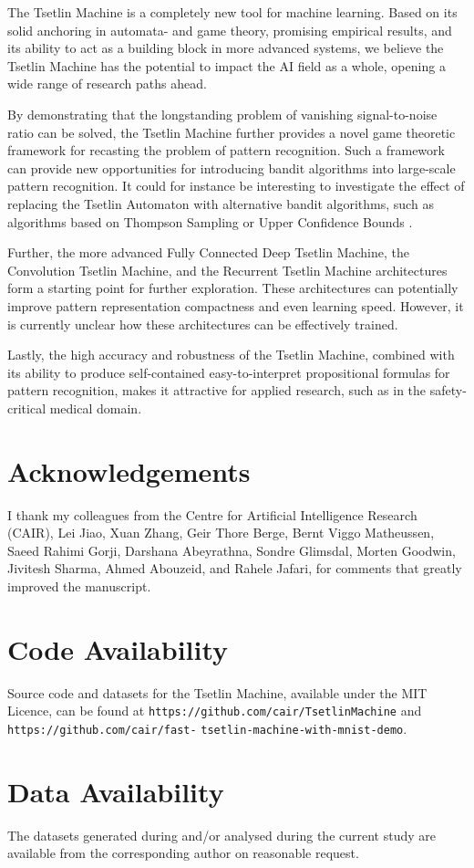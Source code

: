 \documentclass[11pt,a4paper]{article}
\begin{document}
The Tsetlin Machine is a completely new tool for machine learning. Based on its solid anchoring in automata- and game theory, promising empirical results, and its ability to act as a building block in more advanced systems, we believe the Tsetlin Machine has the potential to impact the AI field as a whole, opening a wide range of research paths ahead.

By demonstrating that the longstanding problem of vanishing signal-to-noise ratio can be solved, the Tsetlin Machine further provides a novel game theoretic framework for recasting the problem of pattern recognition. Such a framework can provide new opportunities for introducing bandit algorithms into large-scale pattern recognition. It could for instance be interesting to investigate the effect of replacing the Tsetlin Automaton with alternative bandit algorithms, such as algorithms based on Thompson Sampling \cite{Thompson1933,Granmo2010f,May2012,Chapelle2011} or Upper Confidence Bounds \cite{Auer2003}. 

Further, the more advanced Fully Connected Deep Tsetlin Machine, the Convolution Tsetlin Machine, and the Recurrent Tsetlin Machine architectures form a starting point for further exploration. These architectures can potentially improve pattern representation compactness and even learning speed. However, it is currently unclear how these architectures can be effectively trained.

Lastly, the high accuracy and robustness of the Tsetlin Machine, combined with its ability to produce self-contained easy-to-interpret propositional formulas for pattern recognition, makes it attractive for applied research, such as in the safety-critical medical domain.

\section*{Acknowledgements}
I thank my colleagues from the Centre for Artificial Intelligence Research (CAIR), Lei Jiao, Xuan Zhang, Geir Thore Berge, Bernt Viggo Matheussen, Saeed Rahimi Gorji, Darshana Abeyrathna, Sondre Glimsdal, Morten Goodwin, Jivitesh Sharma, Ahmed Abouzeid, and Rahele Jafari, for comments that greatly improved the manuscript.

\section*{Code Availability}
Source code and datasets for the Tsetlin Machine, available under the MIT Licence, can be found at {\tt https://github.com/cair/TsetlinMachine} and {\tt https://github.com/cair/fast-} {\tt tsetlin-machine-with-mnist-demo}.

\section*{Data Availability}
The datasets generated during and/or analysed during the current study are available from the corresponding author on reasonable request. 



\end{document}

